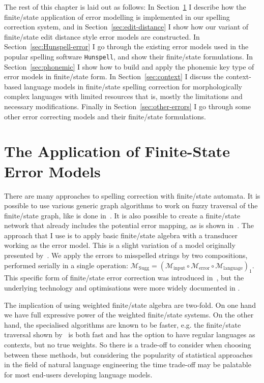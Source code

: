 \documentclass[officiallayout]{unihelcompling}
\begin{document}
The rest of this chapter is laid out as follows: In
Section~\ref{sec:error-application} I describe how the finite\-/state
application of error modelling is implemented in our spelling correction system,
and in Section~\ref{sec:edit-distance} I show how our variant of finite\-/state
edit distance style error models are constructed.  In
Section~\ref{sec:Hunspell-error} I go through the existing error models used in
the popular spelling software \texttt{Hunspell}, and show their finite\-/state
formulations. In Section~\ref{sec:phonemic} I show how to build and apply the
phonemic key type of error models in finite\-/state form.  In
Section~\ref{sec:context} I discuss the context-based language models in
finite\-/state spelling correction for morphologically complex languages with
limited resources that is, mostly the limitations and necessary modifications.
Finally in Section~\ref{sec:other-errors} I go through some other error
correcting models and their finite\-/state formulations.

\section{The Application of Finite-State Error Models}
\label{sec:error-application}

There are many approaches to spelling correction with finite\-/state automata.
It is possible to use various generic graph algorithms to work on fuzzy
traversal of the finite\-/state graph, like is done in~\citet{hulden2009fast}.
It is also possible to create a finite\-/state network that already includes
the potential error mapping, as is shown in~\citet{schulz2002fast}. The
approach that I use is to apply basic finite\-/state algebra with a transducer
working as the error model. This is a slight variation of a model
originally presented by~\citet{mohri2003edit}. We apply the errors to
misspelled strings by two compositions, performed serially in a single
operation: $\mathcal{M}_{\mathrm{Sugg}} = (\mathcal{M}_{\mathrm{input}} \circ
\mathcal{M}_{\mathrm{error}} \circ \mathcal{M}_{\mathrm{language}})_1$.  This
specific form of finite\-/state error correction was introduced
in~, but the underlying technology and
optimisations were more widely documented in \citet{linden2011hfst}.

The implication of using weighted finite\-/state algebra are two-fold. On one
hand we have full expressive power of the weighted finite\-/state
systems.  On the other hand, the specialised algorithms are known to be faster,
e.g.  the finite\-/state traversal shown by~\citet{hulden2009fast} is both fast
and has the option to have regular languages as contexts, but no true weights.
So there is a trade-off to consider when choosing between these methods, but
considering the popularity of statistical approaches in the field of natural
language engineering the time trade-off may be palatable for most end-users
developing language models.
\end{document}
